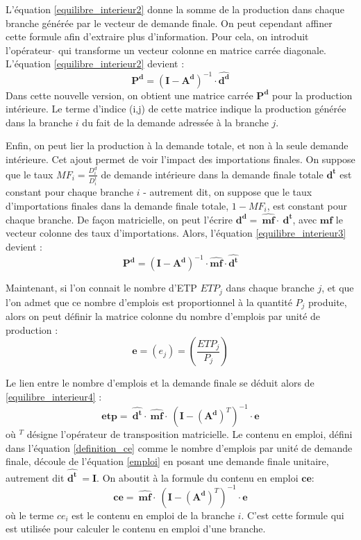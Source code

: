 L'équation \ref{equilibre_interieur2} donne la somme de la production dans chaque branche générée par le vecteur de demande finale. On peut cependant affiner cette formule afin d'extraire plus d'information. Pour cela, on introduit l'opérateur $\widehat{  }$ qui transforme un vecteur colonne en matrice carrée diagonale. L'équation \ref{equilibre_interieur2} devient :
\begin{equation}
\pmb{P^d} = (\pmb{I} - \pmb{A^d})^{-1} \cdot \widehat{\pmb{d^d}}	
\label{equilibre_interieur3}
\end{equation}
Dans cette nouvelle version, on obtient une matrice carrée $\pmb{P^d}$ pour la production intérieure. Le terme d'indice (i,j) de cette matrice indique la production générée dans la branche $i$ du fait de la demande adressée à la branche $j$.

Enfin, on peut lier la production à la demande totale, et non à la seule demande intérieure. Cet ajout permet de voir l'impact des importations finales. On suppose que le taux $MF_i = \frac{D^d_i}{D^t_i}$ de demande intérieure dans la demande finale totale $\pmb{d^t}$ est constant pour chaque branche $i$ - autrement dit, on suppose que le taux d'importations finales dans la demande finale totale, $1 - MF_i$, est constant pour chaque branche. De façon matricielle, on peut l'écrire $\pmb{d^d} =~\widehat{\pmb{mf}} \cdot~\pmb{d^t}$, avec $\pmb{mf}$ le vecteur colonne des taux d'importations. Alors, l'équation \ref{equilibre_interieur3} devient :
\begin{equation}
\pmb{P^d} = (\pmb{I} - \pmb{A^d})^{-1} \cdot \widehat{\pmb{mf}} \cdot \widehat{\pmb{d^t}}	
\label{equilibre_interieur4}
\end{equation}

Maintenant, si l'on connait le nombre d'ETP $ETP_j$ dans chaque branche $j$, et que l'on admet que ce nombre d'emplois est proportionnel à la quantité $P_j$ produite, alors on peut définir la matrice colonne du nombre d'emplois par unité de production : 
$$\pmb{e} = (e_j) = ( \frac{ETP_j}{P_j})$$

Le lien entre le nombre d'emplois et la demande finale se déduit alors de \ref{equilibre_interieur4} :
\begin{equation}
\pmb{etp} =~\widehat{\pmb{d^t}} \cdot~\widehat{\pmb{mf}} \cdot~(\pmb{I} - (\pmb{A^d})^T)^{-1} \cdot \pmb{e}
\label{emploi}
\end{equation}
où $^T$ désigne l'opérateur de transposition matricielle.
Le contenu en emploi, défini dans l'équation \ref{definition_ce} comme le nombre d'emplois par unité de demande finale, découle de l'équation \ref{emploi} en posant une demande finale unitaire, autrement dit $\widehat{\pmb{d^t}}~= \pmb{I}$. On aboutit à la formule du contenu en emploi $\pmb{ce}$: 
\begin{equation}
\pmb{ce} = ~\widehat{\pmb{mf}} \cdot~(\pmb{I} - (\pmb{A^d})^T)^{-1} \cdot \pmb{e}
\label{contenu_emploi}
\end{equation}
où le terme $ce_i$ est le contenu en emploi de la branche $i$. C'est cette formule qui est utilisée pour calculer le contenu en emploi d'une branche.




